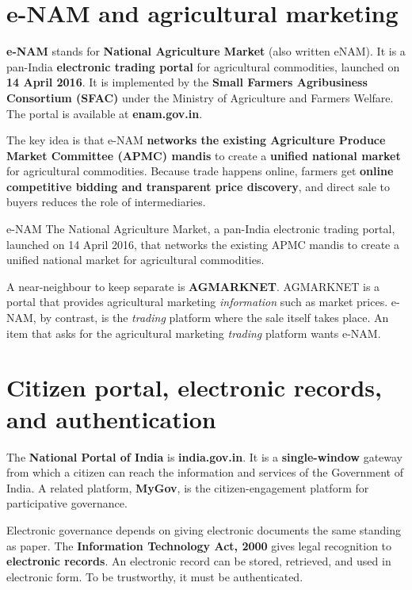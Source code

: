 \section{e-NAM and agricultural marketing}
\textbf{e-NAM} stands for \textbf{National Agriculture Market} (also written
eNAM). It is a pan-India \textbf{electronic trading portal} for agricultural
commodities, launched on \textbf{14 April 2016}. It is implemented by the
\textbf{Small Farmers Agribusiness Consortium (SFAC)} under the Ministry of
Agriculture and Farmers Welfare. The portal is available at
\textbf{enam.gov.in}.

The key idea is that e-NAM \textbf{networks the existing Agriculture Produce
Market Committee (APMC) mandis} to create a \textbf{unified national market}
for agricultural commodities. Because trade happens online, farmers get
\textbf{online competitive bidding and transparent price discovery}, and
direct sale to buyers reduces the role of intermediaries.

\begin{definitionbox}{e-NAM}
The National Agriculture Market, a pan-India electronic trading portal,
launched on 14 April 2016, that networks the existing APMC mandis to create
a unified national market for agricultural commodities.
\end{definitionbox}

A near-neighbour to keep separate is \textbf{AGMARKNET}. AGMARKNET is a
portal that provides agricultural marketing \emph{information} such as
market prices. e-NAM, by contrast, is the \emph{trading} platform where the
sale itself takes place. An item that asks for the agricultural marketing
\emph{trading} platform wants e-NAM.

\section{Citizen portal, electronic records, and authentication}
The \textbf{National Portal of India} is \textbf{india.gov.in}. It is a
\textbf{single-window} gateway from which a citizen can reach the
information and services of the Government of India. A related platform,
\textbf{MyGov}, is the citizen-engagement platform for participative
governance.

Electronic governance depends on giving electronic documents the same
standing as paper. The \textbf{Information Technology Act, 2000} gives legal
recognition to \textbf{electronic records}. An electronic record can be
stored, retrieved, and used in electronic form. To be trustworthy, it must
be authenticated.

